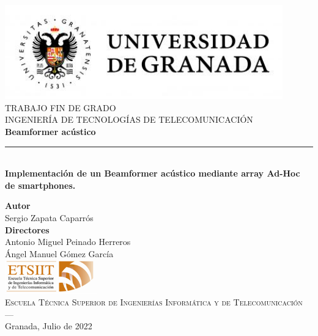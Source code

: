 \begin{titlepage}
 
 
\newlength{\centeroffset}
\setlength{\centeroffset}{-0.5\oddsidemargin}
\addtolength{\centeroffset}{0.5\evensidemargin}
\thispagestyle{empty}

\noindent\hspace*{\centeroffset}\begin{minipage}{\textwidth}

\centering
\includegraphics[width=0.9\textwidth]{imagenes/logo_ugr.jpg}\\[1.4cm]

\textsc{ \Large TRABAJO FIN DE GRADO\\[0.2cm]}
\textsc{INGENIERÍA DE TECNOLOGÍAS DE TELECOMUNICACIÓN}\\[1cm]
% 
{\Huge\bfseries Beamformer acústico\\
}
\noindent\rule[-1ex]{\textwidth}{3pt}\\[3.5ex]
{\large\bfseries Implementación de un Beamformer acústico mediante array Ad-Hoc de smartphones.}
\end{minipage}

\vspace{1cm}
\noindent\hspace*{\centeroffset}\begin{minipage}{\textwidth}
\centering

\textbf{Autor}\\ {Sergio Zapata Caparrós}\\[2.5ex]
\textbf{Directores}\\
{Antonio Miguel Peinado Herreros\\
Ángel Manuel Gómez García}\\[2cm]
\includegraphics[width=0.3\textwidth]{imagenes/etsiit_logo.png}\\[0.1cm]
\textsc{Escuela Técnica Superior de Ingenierías Informática y de Telecomunicación}\\
\textsc{---}\\
Granada, Julio de 2022
\end{minipage}
\end{titlepage}



